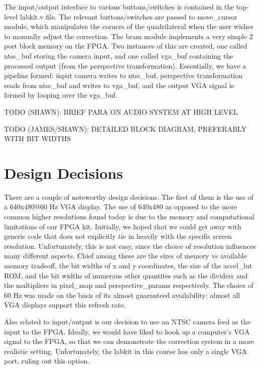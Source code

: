 \documentclass{article}
\begin{document}
The input/output interface to various buttons/switches is contained in the top-level labkit.v file.
The relevant buttons/switches are passed to move\_cursor module, which manipulates the corners of the quadrilateral when the user wishes to manually adjust the correction.
The bram module implements a very simple 2 port block memory on the FPGA.
Two instances of this are created, one called ntsc\_buf storing the camera input, and one called vga\_buf containing the processed output (from the perspective transformation).
Essentially, we have a pipeline formed:
input camera writes to ntsc\_buf, perspective transformation reads from ntsc\_buf and writes to vga\_buf, and the output VGA signal is formed by looping over the vga\_buf.

TODO (SHAWN): BRIEF PARA ON AUDIO SYSTEM AT HIGH LEVEL

TODO (JAMES/SHAWN): DETAILED BLOCK DIAGRAM, PREFERABLY WITH BIT WIDTHS

\section{Design Decisions}

There are a couple of noteworthy design decisions.
The first of them is the use of a 640x480@60 Hz VGA display.
The use of 640x480 as opposed to the more common higher resolutions found today is due to the memory and computational limitations of our FPGA kit.
Initially, we hoped that we could get away with generic code that does not explicitly tie in heavily with the specific screen resolution.
Unfortunately, this is not easy, since the choice of resolution influences many different aspects.
Chief among these are the sizes of memory vs available memory tradeoff, the bit widths of x and y coordinates, the size of the accel\_lut ROM,
and the bit widths of numerous other quantites such as the dividers and the multipliers in pixel\_map and perspective\_params respectively.
The choice of 60 Hz was made on the basis of its almost guaranteed availability: almost all VGA displays support this refresh rate.

Also related to input/output is our decision to use an NTSC camera feed as the input to the FPGA.
Ideally, we would have liked to hook up a computer's VGA signal to the FPGA, so that we can demonstrate the correction system in a more realistic setting.
Unfortunately, the labkit in this course has only a single VGA port, ruling out this option.
\end{document}

